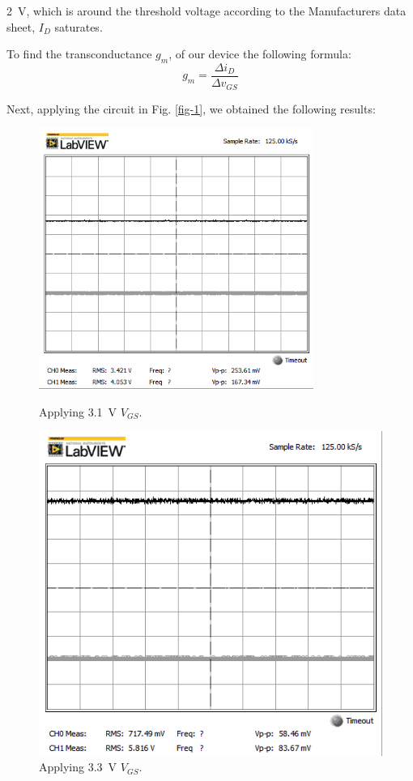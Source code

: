 \documentclass[journal]{IEEEtran}
\begin{document}
\SI{2}{\volt}, which is around the  threshold voltage according to the Manufacturers data sheet,
$I_{D}$ saturates.
\clearpage
\par To find the transconductance $g_{m}$, of our device the following formula:
\begin{equation*}
g_{m}=\frac{\Delta i_{D}}{\Delta v_{GS}}
\end{equation*}
\par Next, applying the circuit in Fig. \ref{fig-1}, we obtained the following results:
\begin{figure}[h]
\centering
\begin{minipage}{.25\textwidth}
  \centering
  \includegraphics[width=0.8\textwidth]{images/1-3dot1vg.png}
  \caption{Applying \SI{3.1}{\volt} $V_{GS}$.}
  \label{fig-vg1}
\end{minipage}%
\begin{minipage}{.25\textwidth}
  \centering
  \includegraphics[width=.8\linewidth]{images/1-3dot3vg.png}
  \caption{Applying \SI{3.3}{\volt} $V_{GS}$.}
  \label{fig-vg2}
\end{minipage}
\end{figure}
\end{document}
